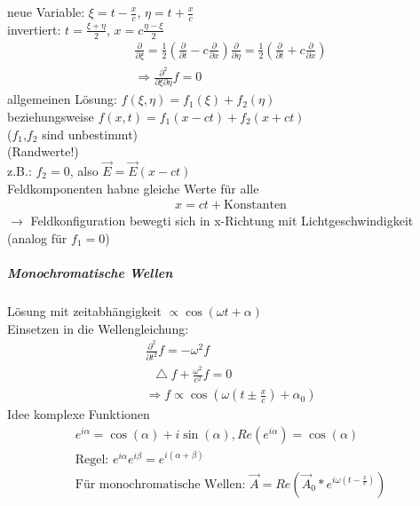 \documentclass[a4paper]{article}
\newcommand*\laplace{\mathop{}\!\mathbin\bigtriangleup}
\begin{document}
neue Variable: $\xi=t-\frac{x}{c}$, $\eta=t+\frac{x}{c}$\\
invertiert: $t=\frac{\xi+\eta}{2} $, $x=c\frac{\eta-\xi}{2}$
\begin{align}
\frac{\partial}{\partial\xi}=\frac{1}{2}\left(\frac{\partial}{\partial t}-c \frac{\partial}{\partial x} \right)
\frac{\partial}{\partial\eta}=\frac{1}{2}\left(\frac{\partial}{\partial t}+c \frac{\partial}{\partial x} \right)\\
\Rightarrow \frac{\partial^2}{\partial \xi \partial\eta}f=0
\end{align}
allgemeinen Lösung: $f(\xi,\eta)=f_1(\xi)+f_2(\eta)$\\
beziehungsweise $f(x,t)=f_1(x-ct)+f_2(x+ct)$\\
($f_1$,$f_2$ sind unbestimmt)\\
(Randwerte!)\\
z.B.: $f_2=0$, also $\vec{E}=\vec{E}(x-ct)$\\
Feldkomponenten habne gleiche Werte für alle 
\begin{align}
x=ct+\text{Konstanten}
\end{align}
$\rightarrow$ Feldkonfiguration bewegti sich in x-Richtung mit Lichtgeschwindigkeit (analog  für $f_1=0$)

\subparagraph{Monochromatische Wellen}
Lösung mit zeitabhängigkeit $\propto \cos(\omega t+\alpha)$\\
Einsetzen in die Wellengleichung:
\begin{align}
\frac{\partial^2}{\partial t^2 }f=-\omega^2f\\
\laplace f+ \frac{\omega^2}{c^2}f=0\\
\Rightarrow f\propto \cos(\omega (t\pm\frac{x}{c})+\alpha_0)
\end{align}
Idee komplexe Funktionen
\begin{align}
e^{i\alpha}=\cos(\alpha)+i\sin(\alpha) , Re(e^{i\alpha})=\cos(\alpha)\\
\text{Regel: } e^{i\alpha}e^{i\beta}=e^{i(\alpha+\beta)}\\
\text{Für monochromatische Wellen: } \vec{A}=Re(\vec{A}_0 * e^{i
\omega(t-\frac{x}{c})})
\end{align}
\end{document}
